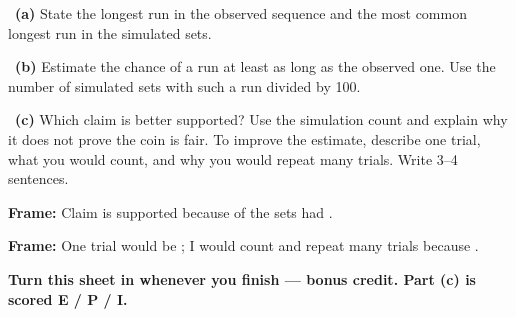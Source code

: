 \documentclass[11pt]{article}
\begin{document}
~\textbf{(a)} State the longest run in the observed sequence and the most common longest run in the simulated sets.\par
\workspace{0.7in}

~\textbf{(b)} Estimate the chance of a run at least as long as the observed one. Use the number of simulated sets with such a run divided by 100.\par
\workspace{1.3in}

~\textbf{(c)} Which claim is better supported? Use the simulation count and explain why it does not prove the coin is fair. To improve the estimate, describe one trial, what you would count, and why you would repeat many trials. Write 3--4 sentences.\par
\workspace{2.0in}

\begin{sentenceframebox}\raggedright\textbf{Frame:} Claim \blank[0.4in] is supported because \blank[0.6in] of the \blank[0.6in] sets had \blank[1.7in].\end{sentenceframebox}

\begin{sentenceframebox}\raggedright\textbf{Frame:} One trial would be \blank[1.8in]; I would count \blank[1.8in] and repeat many trials because \blank[1.8in].\end{sentenceframebox}

\textbf{Turn this sheet in whenever you finish --- bonus credit. Part (c) is scored E / P / I.}\par
\end{document}
